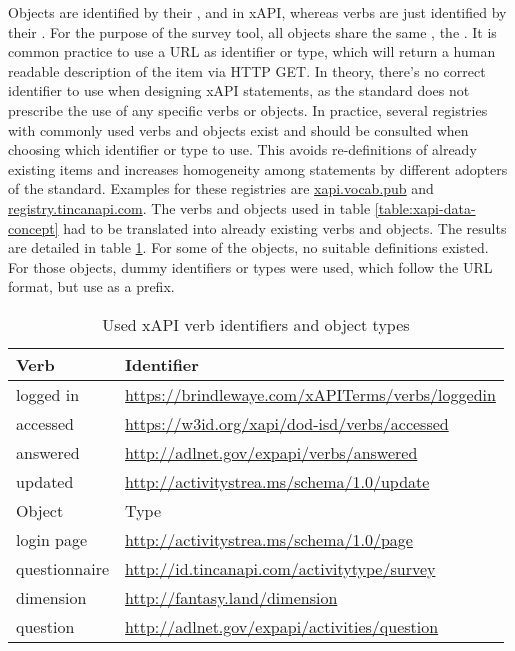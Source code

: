     Objects are identified by their ,  and  in xAPI, 
    whereas verbs are just identified by their . For the purpose of the
    survey tool, all objects share the same , the .
    It is common practice to use a URL as identifier or type,
    which will return a human readable description of the item via HTTP GET. In theory,
    there's no correct identifier to use when designing xAPI statements, as the
    standard does not prescribe the use of any specific verbs or objects. In practice,
    several registries with commonly used verbs and objects exist and should
    be consulted when choosing which identifier or type to use. This avoids re-definitions
    of already existing items and increases homogeneity among statements by
    different adopters of the standard. Examples for these registries are \url{xapi.vocab.pub}
    and \url{registry.tincanapi.com}. The verbs and objects 
    used in table \ref{table:xapi-data-concept} had to be translated into already existing
    verbs and objects. The results are detailed in table \ref{table:xapi-identifiers-used}.
    For some of the objects, no suitable definitions existed. For those
    objects, dummy identifiers or types were used, which follow the URL format, but use 
     as a prefix.

    \begin{table}
        \begin{tabularx}{\textwidth}{|l|X|}
            \hline
            Verb & Identifier \\
            \hline 
            logged in & \url{https://brindlewaye.com/xAPITerms/verbs/loggedin} \\
            accessed & \url{https://w3id.org/xapi/dod-isd/verbs/accessed}\\
            answered & \url{http://adlnet.gov/expapi/verbs/answered}\\
            updated & \url{http://activitystrea.ms/schema/1.0/update}\\
            \hline \hline
            Object & Type \\
            \hline
            login page & \url{http://activitystrea.ms/schema/1.0/page}\\
            questionnaire & \url{http://id.tincanapi.com/activitytype/survey}\\
            dimension & \url{http://fantasy.land/dimension}\\
            question & \url{http://adlnet.gov/expapi/activities/question} \\
            \hline
        \end{tabularx}
        \caption{Used xAPI verb identifiers and object types}
        \label{table:xapi-identifiers-used}
    \end{table}

